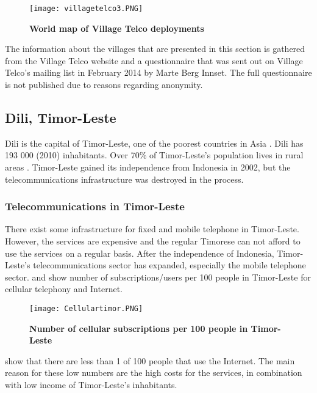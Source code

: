 \begin{figure}[H]
\centering
\texttt{[image: villagetelco3.PNG]}
\caption [World map of Village Telco deployments]{\textbf{World map of Village Telco deployments}}
\label{fig:mapdeployments}
\end{figure}

The information about the villages that are presented in this section is gathered from the Village Telco website \cite{villagetelcodeployments} and a questionnaire that was sent out on Village Telco's mailing list in February 2014 by Marte Berg Innset. The full questionnaire is not published due to reasons regarding anonymity. 

\subsection{Dili, Timor-Leste}\label{sec:timor}
Dili is the capital of Timor-Leste, one of the poorest countries in Asia \cite{vtdili}. Dili has 193 000 (2010) inhabitants. Over 70\% of Timor-Leste's population lives in rural areas \cite{quandltimor}.  Timor-Leste gained its independence from Indonesia in 2002, but the telecommunications infrastructure was destroyed in the process. 


\subsubsection{Telecommunications in Timor-Leste}
There exist some infrastructure for fixed and mobile telephone in Timor-Leste. However, the services are expensive and the regular Timorese can not afford to use the services on a regular basis. After the independence of Indonesia, Timor-Leste's telecommunications sector has expanded, especially the mobile telephone sector.  and  show number of subscriptions/users per 100 people in Timor-Leste for cellular telephony and Internet. 

\begin{figure}[H]
\centering
\texttt{[image: Cellulartimor.PNG]}
\caption[Number of cellular subscriptions per 100 people in Timor-Leste]{\textbf{Number of cellular subscriptions per 100 people in Timor-Leste}}
\label{fig:cellulartimor}
\end{figure}

 show that there are less than 1 of 100 people that use the Internet. The main reason for these low numbers are the high costs for the services, in combination with low income of Timor-Leste's inhabitants. 


